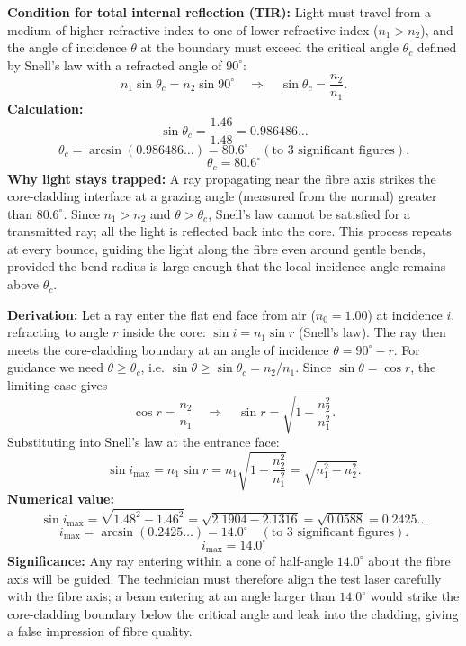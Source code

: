 \documentclass[11pt]{article}
\newcounter{popsec}
\newcounter{popsub}
\newcommand{\courssub}[1]{%
  \stepcounter{popsub}%
  \par\vspace{9pt}\noindent{\popxbold\fontsize{11.5}{13}\selectfont\color{popink}{\color{poporange}\thepopsec.\thepopsub}\hspace{6pt}#1}\par\nopagebreak\vspace{4pt}
}
\begin{document}
\courssub{Model answer}

\begin{exoresolu}
\textbf{Condition for total internal reflection (TIR):} Light must travel from a medium of higher refractive index to one of lower refractive index ($n_1 > n_2$), and the angle of incidence $\theta$ at the boundary must exceed the critical angle $\theta_c$ defined by Snell's law with a refracted angle of $90^\circ$:
\[
n_1 \sin\theta_c = n_2 \sin 90^\circ \quad\Longrightarrow\quad \sin\theta_c = \frac{n_2}{n_1}.
\]
\textbf{Calculation:}
\[
\sin\theta_c = \frac{1.46}{1.48} = 0.986486\ldots
\]
\[
\theta_c = \arcsin(0.986486\ldots) = 80.6^\circ \quad (\text{to 3 significant figures}).
\]
\[\boxed{\theta_c = 80.6^\circ}\]
\textbf{Why light stays trapped:} A ray propagating near the fibre axis strikes the core-cladding interface at a grazing angle (measured from the normal) greater than $80.6^\circ$. Since $n_1 > n_2$ and $\theta > \theta_c$, Snell's law cannot be satisfied for a transmitted ray; all the light is reflected back into the core. This process repeats at every bounce, guiding the light along the fibre even around gentle bends, provided the bend radius is large enough that the local incidence angle remains above $\theta_c$.
\end{exoresolu}

\begin{exoresolu}
\textbf{Derivation:} Let a ray enter the flat end face from air ($n_0=1.00$) at incidence $i$, refracting to angle $r$ inside the core: $\sin i = n_1 \sin r$ (Snell's law). The ray then meets the core-cladding boundary at an angle of incidence $\theta = 90^\circ - r$. For guidance we need $\theta \ge \theta_c$, i.e. $\sin\theta \ge \sin\theta_c = n_2/n_1$. Since $\sin\theta = \cos r$, the limiting case gives
\[
\cos r = \frac{n_2}{n_1} \quad\Longrightarrow\quad \sin r = \sqrt{1 - \frac{n_2^2}{n_1^2}}.
\]
Substituting into Snell's law at the entrance face:
\[
\sin i_{\max} = n_1 \sin r = n_1 \sqrt{1 - \frac{n_2^2}{n_1^2}} = \sqrt{n_1^2 - n_2^2}.
\]
\textbf{Numerical value:}
\[
\sin i_{\max} = \sqrt{1.48^2 - 1.46^2} = \sqrt{2.1904 - 2.1316} = \sqrt{0.0588} = 0.2425\ldots
\]
\[
i_{\max} = \arcsin(0.2425\ldots) = 14.0^\circ \quad (\text{to 3 significant figures}).
\]
\[\boxed{i_{\max} = 14.0^\circ}\]
\textbf{Significance:} Any ray entering within a cone of half-angle $14.0^\circ$ about the fibre axis will be guided. The technician must therefore align the test laser carefully with the fibre axis; a beam entering at an angle larger than $14.0^\circ$ would strike the core-cladding boundary below the critical angle and leak into the cladding, giving a false impression of fibre quality.
\end{exoresolu}
\end{document}
